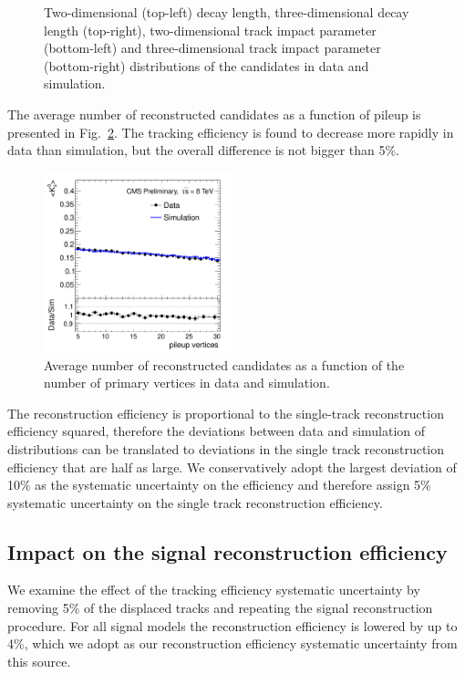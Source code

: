 \begin{figure}[htbp]
\caption{Two-dimensional (top-left) decay length, three-dimensional decay length (top-right), two-dimensional track impact parameter (bottom-left) and three-dimensional track impact parameter (bottom-right) distributions 
of the \Kshort candidates in data and simulation. \label{fig:ksdisplacement}}
\end{figure}

The average number of 
reconstructed \Kshort candidates as a function of pileup is presented in Fig.~\ref{fig:kspileup}.
The tracking efficiency is found to decrease more rapidly in data than simulation, but the
overall difference is not bigger than 5\%.

\begin{figure}[htbp]
\centering
\includegraphics[width=0.49\textwidth]{plots/kshort/effnPV.pdf}
\caption{Average number of reconstructed \Kshort candidates as a function of the number of primary vertices in data and simulation. \label{fig:kspileup}}
\end{figure}

The \Kshort reconstruction efficiency is proportional to the single-track reconstruction efficiency squared, 
therefore the deviations between data and simulation of \Kshort distributions can be translated to deviations in the single track reconstruction efficiency that are half as large. We conservatively adopt the largest deviation 
of 10\% as the systematic uncertainty on the \Kshort efficiency and therefore assign 5\% systematic uncertainty on the 
single track reconstruction efficiency. 

\subsection{Impact on the signal reconstruction efficiency}

We examine the effect of the tracking efficiency systematic uncertainty by removing 5\% of the displaced tracks 
 and repeating the signal reconstruction procedure.
For all signal models the reconstruction efficiency is lowered by up to 4\%, which we adopt as our reconstruction
efficiency systematic uncertainty from this source.  

